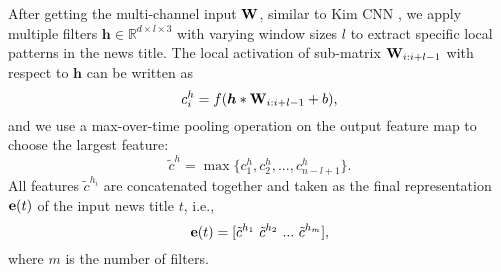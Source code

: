 \documentclass[sigconf]{acmart}
\begin{document}
		After getting the multi-channel input ${\bf W}$, similar to Kim CNN \cite{kim2014convolutional}, we apply multiple filters ${\bm h} \in \mathbb R^{d \times l \times 3}$ with varying window sizes $l$ to extract specific local patterns in the news title.
		The local activation of sub-matrix ${\bf W}_{i:i+l-1}$ with respect to $\bm h$ can be written as
		\begin{equation}
			c_i^h = f ({\bm h} * {\bf W}_{i:i+l-1} + b),
		\end{equation}
		and we use a max-over-time pooling operation on the output feature map to choose the largest feature:
		\begin{equation}
			\tilde c^h = \max \{ c_1^h, c_2^h, ..., c_{n-l+1}^h \}.
		\end{equation}
		All features $\tilde c^{h_i}$ are concatenated together and taken as the final representation ${\bf e}(t)$ of the input news title $t$, i.e.,
		\begin{equation}
			{\bf e}(t) = [\tilde c^{h_1} \ \tilde c^{h_2} \ ... \ \tilde c^{h_m}],
		\end{equation}
		where $m$ is the number of filters.
		
		
\end{document}
